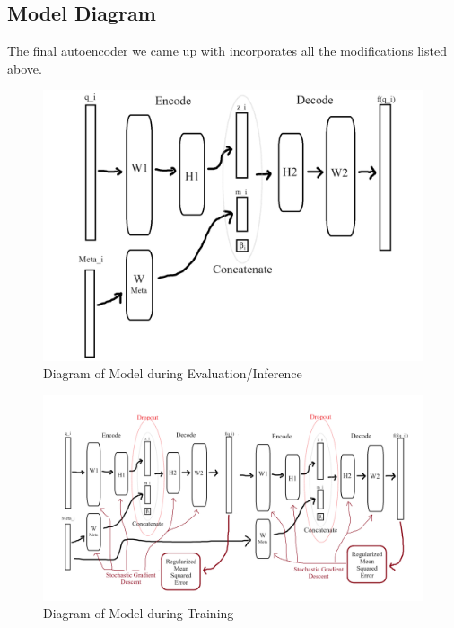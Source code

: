 \documentclass{article}
\begin{document}
\subsection{Model Diagram}
The final autoencoder we came up with incorporates all the modifications listed above.
\begin{figure}[H]
\centering
\includegraphics[width=1
\linewidth]{figures/model.png}
\caption{Diagram of Model during Evaluation/Inference}
\label{fig:enter-label}
\end{figure}

\begin{figure}[H]
    \includegraphics[width=\textwidth,height=\textheight,keepaspectratio]{figures/model during training.png}
    \caption{Diagram of Model during Training}
    \label{fig:enter-label}
\end{figure}
\newpage
\end{document}
